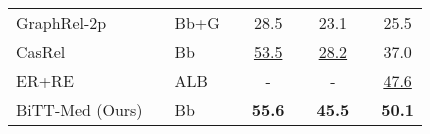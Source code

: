 \documentclass[conference]{IEEEtran}
\begin{document}
\begin{table}[t]
{\begin{tabular}{@{}llllclclc@{}}
        GraphRel-2p \cite{Fu2019Graphrel} \textsuperscript{}              &  & Bb+G     &  & 28.5             &  & 23.1             &  & 25.5             \\
        CasRel \cite{Wei2020CasRel} \textsuperscript{}              &  & Bb     &  & \underline{53.5}             &  & \underline{28.2}             &  & 37.0             \\
        ER+RE \cite{Zhang2022CBLUE}              &  & ALB     &  & -             &  & -             &  & \underline{47.6}             \\ \midrule
        BiTT-Med (Ours)                                                &  & Bb      &  & \textbf{55.6}             &  & \textbf{45.5}             &  & \textbf{50.1}             \\ \bottomrule
        \end{tabular}}
\end{table}
\end{document}
